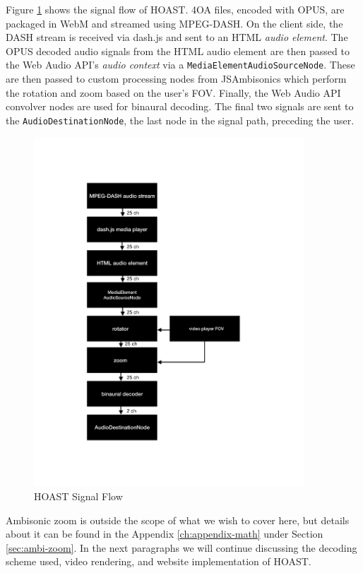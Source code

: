 Figure \ref{fig:hoast-sig-flow} shows the signal flow of HOAST. 4OA files, encoded with OPUS, are packaged in WebM and streamed using MPEG-DASH. On the client side, the DASH stream is received via dash.js and sent to an HTML \textit{audio element}. The OPUS decoded audio signals from the HTML audio element are then passed to the Web Audio API's \textit{audio context} via a \texttt{MediaElementAudioSourceNode}. These are then passed to custom processing nodes from JSAmbisonics \cite{politis2016jsambisonics} which perform the rotation and zoom based on the user's FOV. Finally, the Web Audio API convolver nodes are used for binaural decoding. The final two signals are sent to the \texttt{AudioDestinationNode}, the last node in the signal path, preceding the user. 

\begin{figure}[ht!]%
\centering
\includegraphics[width=0.9\textwidth]{img/hoast-sig-flow.pdf} 
\caption{HOAST Signal Flow}
\label{fig:hoast-sig-flow}
\end{figure}

Ambisonic zoom is outside the scope of what we wish to cover here, but details about it can be found in the Appendix \ref{ch:appendix-math} under Section \ref{sec:ambi-zoom}. In the next paragraphs we will continue discussing the decoding scheme used, video rendering, and website implementation of HOAST.


